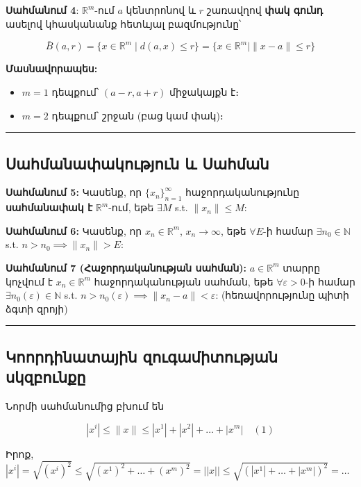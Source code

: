 \documentclass[12pt, a4paper]{article}
\begin{document}
\textbf{Սահմանում 4}: $\mathbb{R}^m$-ում $a$ կենտրոնով և $r$ շառավղով \textbf{փակ գունդ} ասելով կհասկանանք հետևյալ բազմությունը՝

$$
\bar{B}(a, r) = \{x \in \mathbb{R}^m \mid d(a, x) \le r\} = \{x \in \mathbb{R}^m \mid \|x - a\| \le r\}
$$

\textbf{Մասնավորապես:}

\begin{itemize}
    \item $m=1$ դեպքում՝ $(a-r, a+r)$ միջակայքն է։
    \item $m=2$ դեպքում՝ շրջան (բաց կամ փակ)։
\end{itemize}

\vspace{1em}
\hrule
\vspace{1em}

\subsection{Սահմանափակություն և Սահման}

\textbf{Սահմանում 5:} Կասենք, որ $\{x_n\}_{n=1}^\infty$ հաջորդականությունը \textbf{սահմանափակ է} $\mathbb{R}^m$-ում, եթե $\exists M$ s.t. $\|x_n\| \le M$:

\textbf{Սահմանում 6:} Կասենք, որ $x_n \in \mathbb{R}^m$, $x_n \to \infty$, եթե $\forall E$-ի համար $\exists n_0 \in \mathbb{N}$ s.t. $n > n_0 \implies \|x_n\| > E$:

\textbf{Սահմանում 7 (Հաջորդականության սահման):} $a \in \mathbb{R}^m$ տարրը կոչվում է $x_n \in \mathbb{R}^m$ հաջորդականության սահման, եթե $\forall \varepsilon > 0$-ի համար $\exists n_0(\varepsilon) \in \mathbb{N}$ s.t. $n > n_0(\varepsilon) \implies \|x_n - a\| < \varepsilon$: (հեռավորությունը պիտի ձգտի զրոյի)

\vspace{1em}
\hrule
\vspace{1em}

\subsection{Կոորդինատային զուգամիտության սկզբունքը}

Նորմի սահմանումից բխում են

$$
|x^i| \le \|x\| \le |x^1| + |x^2| + \dots + |x^m| \quad (1)
$$

Իրոք, $|x^i| = \sqrt{(x^i)^2} \le \sqrt{(x^1)^2 + \dots + (x^m)^2} = ||x|| \le \sqrt{(|x^1| + \dots + |x^m|)^2} = \dots$
\end{document}

